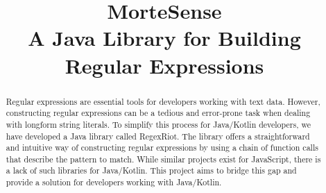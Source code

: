 \documentclass[conference]{IEEEtran}
\begin{document}
\title{MorteSense \\A Java Library for Building Regular Expressions}

\author{
    \and
    \and
        \and
    

}


\maketitle

\begin{abstract}
    Regular expressions are essential tools for developers working with text data.
    However, constructing regular expressions can be a tedious and error-prone task when dealing with longform string literals.
    To simplify this process for Java/Kotlin developers, we have developed a Java library called RegexRiot.
    The library offers a straightforward and intuitive way of constructing regular expressions by using a chain of
    function calls that describe the pattern to match.
    While similar projects exist for JavaScript, there is a lack of such libraries for Java/Kotlin.
    This project aims to bridge this gap and provide a solution for developers working with Java/Kotlin.
\end{abstract}
\end{document}
